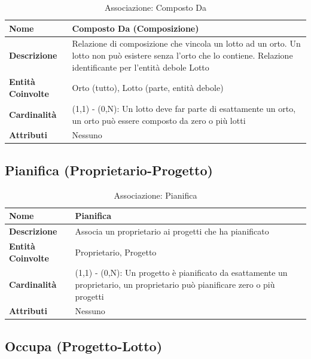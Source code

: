 \documentclass[12pt,a4paper]{article}
\begin{document}
\begin{table}[H]
\centering
\caption{Associazione: Composto Da}
\begin{tabularx}{\textwidth}{|l|X|}
\hline
\textbf{Nome} & Composto Da (Composizione) \\
\hline
\textbf{Descrizione} & Relazione di composizione che vincola un lotto ad un orto. Un lotto non può esistere senza l'orto che lo contiene. Relazione identificante per l'entità debole Lotto \\
\hline
\textbf{Entità Coinvolte} & Orto (tutto), Lotto (parte, entità debole) \\
\hline
\textbf{Cardinalità} & (1,1) - (0,N): Un lotto deve far parte di esattamente un orto, un orto può essere composto da zero o più lotti \\
\hline
\textbf{Attributi} & Nessuno \\
\hline
\end{tabularx}
\end{table}

\subsection{Pianifica (Proprietario-Progetto)}

\begin{table}[H]
\centering
\caption{Associazione: Pianifica}
\begin{tabularx}{\textwidth}{|l|X|}
\hline
\textbf{Nome} & Pianifica \\
\hline
\textbf{Descrizione} & Associa un proprietario ai progetti che ha pianificato \\
\hline
\textbf{Entità Coinvolte} & Proprietario, Progetto \\
\hline
\textbf{Cardinalità} & (1,1) - (0,N): Un progetto è pianificato da esattamente un proprietario, un proprietario può pianificare zero o più progetti \\
\hline
\textbf{Attributi} & Nessuno \\
\hline
\end{tabularx}
\end{table}

\subsection{Occupa (Progetto-Lotto)}
\end{document}
